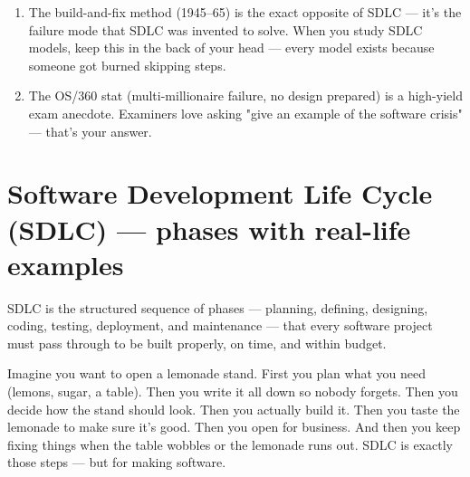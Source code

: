 \documentclass{report}
\begin{document}
\begin{note}
\begin{enumerate}
\item The build-and-fix method (1945–65) is the exact opposite of SDLC — it's the failure mode that SDLC was invented to solve. When you study SDLC models, keep this in the back of your head — every model exists because someone got burned skipping steps.
\item The OS/360 stat (multi-millionaire failure, no design prepared) is a high-yield exam anecdote. Examiners love asking "give an example of the software crisis" — that's your answer.
\end{enumerate}
\end{note}


\section{Software Development Life Cycle (SDLC) — phases with real-life examples}
SDLC is the structured sequence of phases — planning, defining, designing, coding, testing, deployment, and maintenance — that every software project must pass through to be built properly, on time, and within budget.

\begin{eli5}
	Imagine you want to open a lemonade stand. First you plan what you need (lemons, sugar, a table). Then you write it all down so nobody forgets. Then you decide how the stand should look. Then you actually build it. Then you taste the lemonade to make sure it's good. Then you open for business. And then you keep fixing things when the table wobbles or the lemonade runs out. SDLC is exactly those steps — but for making software.
\end{eli5}

\end{document}
